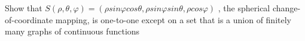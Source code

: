 Show that \( S(ρ, θ, φ) = (ρ sin φ cos θ, ρ sin φ sin θ, ρ cos φ) \) , the spherical change-of-coordinate mapping, is one-to-one except on a set that is a union of finitely many graphs of continuous functions

